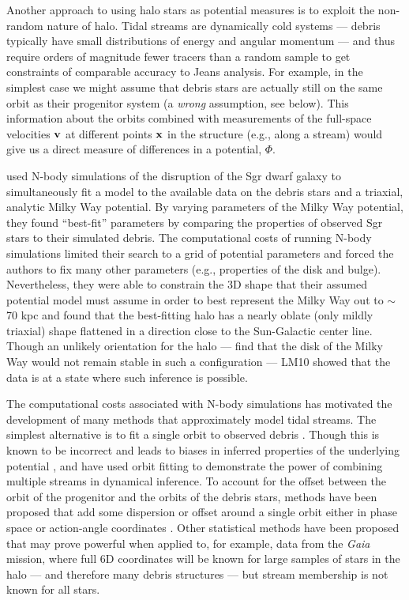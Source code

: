 \documentclass[letterpaper,12pt,preprint]{aastex}
\newcommand{\project}[1]{\textsl{#1}}
\newcommand{\gaia}{\project{Gaia}}
\begin{document}
Another approach to using halo stars as potential measures is to exploit the non-random nature of halo. Tidal streams are dynamically cold systems --- debris typically have small distributions of energy and angular momentum --- and thus require orders of magnitude fewer tracers than a random sample to get constraints of comparable accuracy to Jeans analysis. For example, in the simplest case we might assume that debris stars are actually still on the same orbit as their progenitor system (a \emph{wrong} assumption, see below). This information about the orbits combined with measurements of the full-space velocities ${\bf v}$ at different points ${\bf x}$ in the structure (e.g., along a stream) would give us a direct measure of differences in a potential, $\Phi$.

\citet[][LM10]{law10} used N-body simulations of the disruption of the Sgr dwarf galaxy to simultaneously fit a model to the available data on the debris stars and a triaxial, analytic Milky Way potential. By varying parameters of the Milky Way potential, they found ``best-fit'' parameters by comparing the properties of observed Sgr stars to their simulated debris. The computational costs of running N-body simulations limited their search to a grid of potential parameters and forced the authors to fix many other parameters (e.g., properties of the disk and bulge). Nevertheless, they were able to constrain the 3D shape that their assumed potential model must assume in order to best represent the Milky Way out to $\sim$70 kpc and found that the best-fitting halo has a nearly oblate (only mildly triaxial) shape flattened in a direction close to the Sun-Galactic center line. Though an unlikely orientation for the halo --- \cite{debattista13} find that the disk of the Milky Way would not remain stable in such a configuration --- LM10 showed that the data is at a state where such inference is possible. 

The computational costs associated with N-body simulations has motivated the development of many methods that approximately model tidal streams. The simplest alternative is to fit a single orbit to observed debris \citep[e.g.,][]{koposov10, deg13}. Though this is known to be incorrect and leads to biases in inferred properties of the underlying potential \citep[e.g.,][]{eyre11, lux13, sanders13a}, \cite{deg14} and \cite{lux13} have used orbit fitting to demonstrate the power of combining multiple streams in dynamical inference. To account for the offset between the orbit of the progenitor and the orbits of the debris stars, methods have been proposed that add some dispersion or offset around a single orbit either in phase space \citep[e.g.,][]{eyre09a, varghese11, kuepper12} or action-angle coordinates \citep{eyre11, sanders13b, bovy14, sanders14}. Other statistical methods have been proposed \citep[][]{johnston99a, penarrubia12, sanderson14} that may prove powerful when applied to, for example, data from the \gaia\, mission, where full 6D coordinates will be known for large samples of stars in the halo --- and therefore many debris structures --- but stream membership is not known for all stars.
\end{document}
